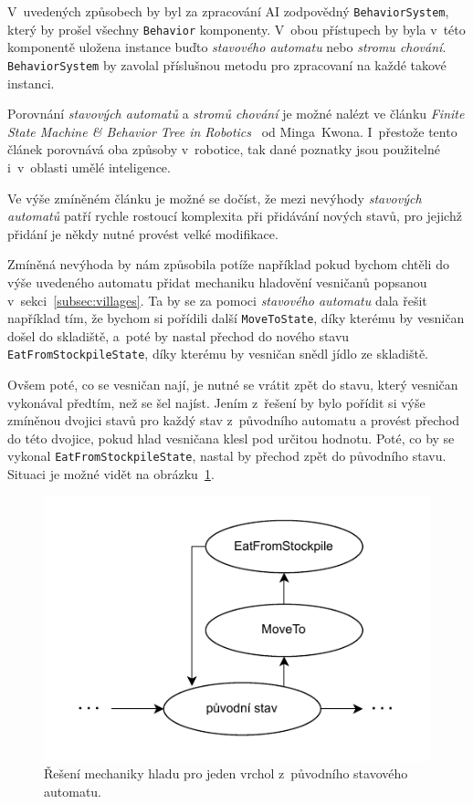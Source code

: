 V~uvedených způsobech by byl za zpracování AI zodpovědný \texttt{BehaviorSystem}, který by prošel všechny \texttt{Behavior} komponenty. V~obou přístupech by byla v~této komponentě uložena instance buďto \textit{stavového automatu} nebo \textit{stromu chování}. \texttt{BehaviorSystem} by zavolal příslušnou metodu pro zpracovaní na každé takové instanci.


Porovnání \textit{stavových automatů} a \textit{stromů chování} je možné nalézt ve článku \textit{Finite State Machine \& Behavior Tree in Robotics}~\cite{FMTAndBTInRobotics} od Minga~Kwona. I~přestože tento článek porovnává oba způsoby v~robotice, tak dané poznatky jsou použitelné i~v~oblasti umělé inteligence.

Ve výše zmíněném článku je možné se dočíst, že mezi nevýhody \textit{stavových automatů} patří rychle rostoucí komplexita při přidávání nových stavů, pro jejichž přidání je někdy nutné provést velké modifikace.

Zmíněná nevýhoda by nám způsobila potíže například pokud bychom chtěli do výše uvedeného automatu přidat mechaniku hladovění vesničanů popsanou v~sekci~\ref{subsec:villages}. Ta by se za pomoci \textit{stavového automatu} dala řešit například tím, že bychom si pořídili další \texttt{MoveToState}, díky kterému by vesničan došel do skladiště, a~poté by nastal přechod do nového stavu \texttt{EatFromStockpileState}, díky kterému by vesničan snědl jídlo ze skladiště. 

Ovšem poté, co se vesničan nají, je nutné se vrátit zpět do stavu, který vesničan vykonával předtím, než se šel najíst. Jením z~řešení by bylo pořídit si výše zmíněnou dvojici stavů pro každý stav z~původního automatu a provést přechod do této dvojice, pokud hlad vesničana klesl pod určitou hodnotu. Poté, co by se vykonal \texttt{EatFromStockpileState}, nastal by přechod zpět do původního stavu. Situaci je možné vidět na obrázku~\ref{fig:transition}.

\begin{figure}[!htb]
    \centering
    \includegraphics[width=0.6\linewidth]{img/transition.pdf}
    \caption{Řešení mechaniky hladu pro jeden vrchol z~původního stavového automatu.}
    \label{fig:transition}
\end{figure}

